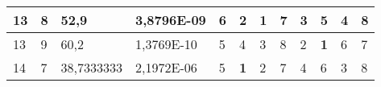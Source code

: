 \documentclass[conference]{IEEEtran}
\begin{document}
\begin{table*}[]
\begin{tabular}{|llll|llllllll|}
\multicolumn{1}{|l|}{13}                                                    & \multicolumn{1}{l|}{8}                                                        & \multicolumn{1}{l|}{52,9}                                                         & 3,8796E-09                     & \multicolumn{1}{l|}{6}                                                  & \multicolumn{1}{l|}{2}                                                  & \multicolumn{1}{l|}{\textbf{1}}                                         & \multicolumn{1}{l|}{7}                                                  & \multicolumn{1}{l|}{3}                                                  & \multicolumn{1}{l|}{5}                                                  & \multicolumn{1}{l|}{4}                                                  & 8                          \\ \hline
\multicolumn{1}{|l|}{13}                                                    & \multicolumn{1}{l|}{9}                                                        & \multicolumn{1}{l|}{60,2}                                                         & 1,3769E-10                     & \multicolumn{1}{l|}{5}                                                  & \multicolumn{1}{l|}{4}                                                  & \multicolumn{1}{l|}{3}                                                  & \multicolumn{1}{l|}{8}                                                  & \multicolumn{1}{l|}{2}                                                  & \multicolumn{1}{l|}{\textbf{1}}                                         & \multicolumn{1}{l|}{6}                                                  & 7                          \\ \hline
\multicolumn{1}{|l|}{14}                                                    & \multicolumn{1}{l|}{7}                                                        & \multicolumn{1}{l|}{38,7333333}                                                   & 2,1972E-06                     & \multicolumn{1}{l|}{5}                                                  & \multicolumn{1}{l|}{\textbf{1}}                                         & \multicolumn{1}{l|}{2}                                                  & \multicolumn{1}{l|}{7}                                                  & \multicolumn{1}{l|}{4}                                                  & \multicolumn{1}{l|}{6}                                                  & \multicolumn{1}{l|}{3}                                                  & 8                          \\ \hline

\end{tabular}
\end{table*}
\end{document}
